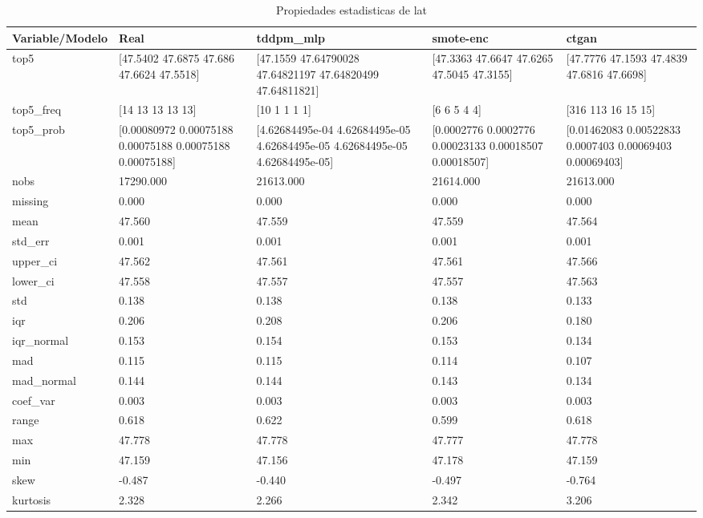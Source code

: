 \begin{table}[H]
\centering
\caption{Propiedades  estadisticas de lat}
\label{table-stats-lat}
\begin{tabular}{|l|m{10em}|m{10em}|m{10em}|m{10em}|}
\hline
 \rowcolor[gray]{0.8}
Variable/Modelo & Real & tddpm\_mlp & smote-enc & ctgan \\
\hline top5 & [47.5402 47.6875 47.686  47.6624 47.5518] & [47.1559     47.64790028 47.64821197 47.64820499 47.64811821] & [47.3363 47.6647 47.6265 47.5045 47.3155] & [47.7776 47.1593 47.4839 47.6816 47.6698] \\
\hline top5\_freq & [14 13 13 13 13] & [10  1  1  1  1] & [6 6 5 4 4] & [316 113  16  15  15] \\
\hline top5\_prob & [0.00080972 0.00075188 0.00075188 0.00075188 0.00075188] & [4.62684495e-04 4.62684495e-05 4.62684495e-05 4.62684495e-05
 4.62684495e-05] & [0.0002776  0.0002776  0.00023133 0.00018507 0.00018507] & [0.01462083 0.00522833 0.0007403  0.00069403 0.00069403] \\
\hline nobs & 17290.000 & 21613.000 & 21614.000 & 21613.000 \\
\hline missing & 0.000 & 0.000 & 0.000 & 0.000 \\
\hline mean & 47.560 & 47.559 & 47.559 & 47.564 \\
\hline std\_err & 0.001 & 0.001 & 0.001 & 0.001 \\
\hline upper\_ci & 47.562 & 47.561 & 47.561 & 47.566 \\
\hline lower\_ci & 47.558 & 47.557 & 47.557 & 47.563 \\
\hline std & 0.138 & 0.138 & 0.138 & 0.133 \\
\hline iqr & 0.206 & 0.208 & 0.206 & 0.180 \\
\hline iqr\_normal & 0.153 & 0.154 & 0.153 & 0.134 \\
\hline mad & 0.115 & 0.115 & 0.114 & 0.107 \\
\hline mad\_normal & 0.144 & 0.144 & 0.143 & 0.134 \\
\hline coef\_var & 0.003 & 0.003 & 0.003 & 0.003 \\
\hline range & 0.618 & 0.622 & 0.599 & 0.618 \\
\hline max & 47.778 & 47.778 & 47.777 & 47.778 \\
\hline min & 47.159 & 47.156 & 47.178 & 47.159 \\
\hline skew & -0.487 & -0.440 & -0.497 & -0.764 \\
\hline kurtosis & 2.328 & 2.266 & 2.342 & 3.206 \\

\end{tabular}
\end{table}

